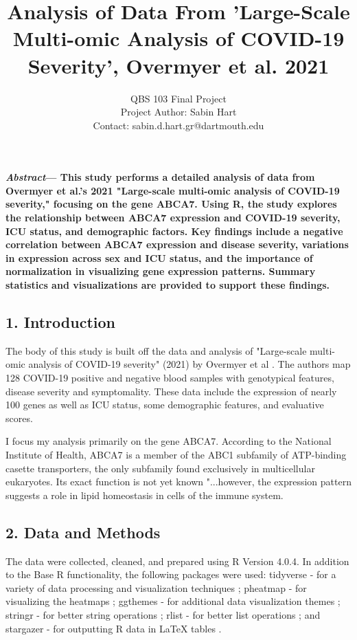 \documentclass{article}
\title{\vspace{-2.5cm} Analysis of Data From 'Large-Scale Multi-omic Analysis of COVID-19 Severity', Overmyer et al. 2021}
\author{
QBS 103 Final Project\\
Project Author: Sabin Hart\\
Contact: sabin.d.hart.gr@dartmouth.edu\\}
\date{}
\begin{document}
\maketitle

\textbf{\textit{Abstract}---
This study performs a detailed analysis of data from Overmyer et al.'s 2021 "Large-scale multi-omic analysis of COVID-19 severity," focusing on the gene ABCA7. Using R, the study explores the relationship between ABCA7 expression and COVID-19 severity, ICU status, and demographic factors. Key findings include a negative correlation between ABCA7 expression and disease severity, variations in expression across sex and ICU status, and the importance of normalization in visualizing gene expression patterns. Summary statistics and visualizations are provided to support these findings.}

\subsection*{1. Introduction}

The body of this study is built off the data and analysis of "Large-scale
multi-omic analysis of COVID-19 severity" (2021) by Overmyer et al \cite{Overmyer2021}. The authors map 128 COVID-19 positive and negative blood samples with genotypical features, disease severity and symptomality. These data include the expression of nearly 100 genes as well as ICU status, some demographic features, and evaluative scores.

I focus my analysis primarily on the gene ABCA7. According to the National Institute of Health, ABCA7 is a member of the ABC1 subfamily of ATP-binding casette transporters, the only subfamily found exclusively in multicellular eukaryotes. Its exact function is not yet known  "...however, the expression pattern suggests a role in lipid homeostasis in cells of the immune system. \cite{nihABCA7Binding}


\subsection*{2. Data and Methods}

The data were collected, cleaned, and prepared using R Version 4.0.4. In addition to the Base R functionality, the following packages were used: tidyverse - for a variety of data processing and visualization techniques \cite{R-tidyverse}; pheatmap - for visualizing the heatmaps \cite{R-pheatmap}; ggthemes - for additional data visualization themes \cite{R-ggthemes}; stringr - for better string operations \cite{R-stringr}; rlist - for better list operations \cite{R-rlist}; and stargazer - for outputting R data in LaTeX tables \cite{R-stargazer}.
\end{document}

